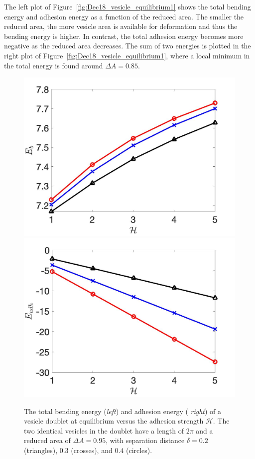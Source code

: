 \documentclass[prf,superscriptaddress,showkeys]{revtex4-1}
\begin{document}
The left plot of Figure~\ref{fig:Dec18_vesicle_equilibrium1} shows the
total bending energy and adhesion energy as a function of the reduced
area. The smaller the reduced area, the more vesicle area is available
for deformation and thus the bending energy is higher.  In contrast, the
total adhesion energy becomes more negative as the reduced area
decreases.  The sum of two energies is plotted in the right plot of
Figure~\ref{fig:Dec18_vesicle_equilibrium1}, where a local minimum in
the total energy is found around $\Delta A = 0.85$.

\begin{figure}
\includegraphics[keepaspectratio=true,scale=0.18]{figs/Dec18_Eb_vs_sigma_rA0p9502.jpeg}
\includegraphics[keepaspectratio=true,scale=0.18]{figs/Dec18_Eadh_vs_sigma_rA0p9502.jpeg}
  \caption{\label{fig:Dec18_equilibrium} 
  The total bending energy ({\em left}) and adhesion energy ({\em
  right}) of a vesicle doublet at equilibrium versus the adhesion
  strength $\mathcal{H}$.  The two identical vesicles in the doublet
  have a length of $2\pi$ and a reduced area of $\Delta A=0.95$, with
  separation distance $\delta = 0.2$ (triangles), $0.3$ (crosses), and
  $0.4$ (circles).}
\end{figure}
\end{document}
